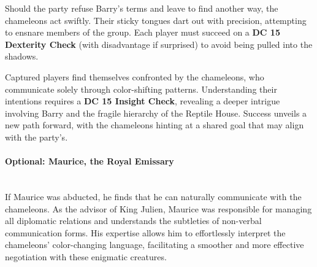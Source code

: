 {\noindent\entryfont Should the party refuse Barry's terms and leave to find another way, the chameleons act swiftly. Their sticky tongues dart out with precision, attempting to ensnare members of the group. Each player must succeed on a \textbf{DC 15 Dexterity Check} (with disadvantage if surprised) to avoid being pulled into the shadows.

Captured players find themselves confronted by the chameleons, who communicate solely through color-shifting patterns. Understanding their intentions requires a \textbf{DC 15 Insight Check}, revealing a deeper intrigue involving Barry and the fragile hierarchy of the Reptile House. Success unveils a new path forward, with the chameleons hinting at a shared goal that may align with the party's.}

\paragraph*{Optional: Maurice, the Royal Emissary}\hfill\\
{\entryfont If Maurice was abducted, he finds that he can naturally communicate with the chameleons. As the advisor of King Julien, Maurice was responsible for managing all diplomatic relations and understands the subtleties of non-verbal communication forms. His expertise allows him to effortlessly interpret the chameleons' color-changing language, facilitating a smoother and more effective negotiation with these enigmatic creatures.}

